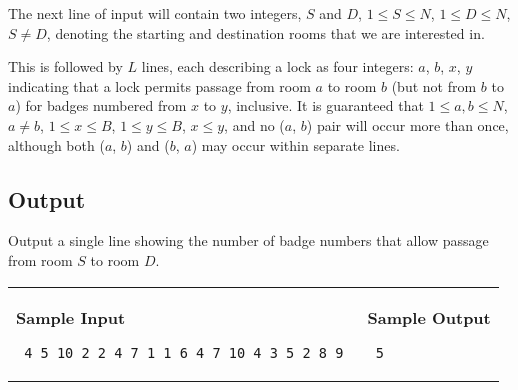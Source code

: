 \documentclass[11pt]{article}
\begin{document}
The next line of input will contain two integers, $S$ and $D$, $1 \leq S \leq N$, $1 \leq D \leq N$, $S \neq D$, denoting the starting and destination rooms that we are interested in.

This is followed by $L$ lines, each describing a lock as four integers: $a$, $b$, $x$, $y$ indicating that a lock permits passage from room $a$ to room $b$ (but not from $b$ to $a$) for badges numbered from $x$ to $y$, inclusive. It is guaranteed that $1 \leq a,b \leq N$, $a \neq b$, $1 \leq x \leq B$, $1 \leq y \leq B$, $x \leq y$, and no ($a$, $b$) pair will occur more than once, although both ($a$, $b$) and ($b$, $a$) may occur within separate lines.

\subsection*{Output}

Output a single line showing the number of badge numbers that allow passage from room $S$ to room $D$.

\vspace{0.25in}\hspace{-0.3in}\begin{tabular}{ll}

\parbox{3in}{{\large\bf Sample Input}

\vspace{0.15in}

{\tt 
4 5 10 2 2 4 7 1 1 6 4 7 10 4 3 5 2 8 9
}
}

&

\parbox{3in}{{\large\bf Sample Output}

\vspace{0.15in}

{\tt
5
}
}

\\
\end{tabular}
\end{document}

